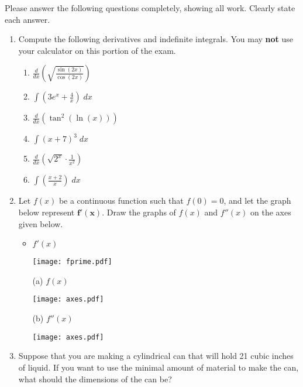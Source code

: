 \documentclass[11pt]{article}
\newcommand{\ds}{\displaystyle}
\begin{document}
\drawtitle

\noindent Please answer the following questions completely, showing all work. Clearly
state each answer.

\begin{enumerate}
\item Compute the following derivatives and indefinite integrals.  You
  may \textbf{not} use your calculator on this portion of the exam.
  \begin{enumerate}
  \item $\ds\frac{d}{dx}\left(\sqrt{\frac{\sin(2x)}{\cos(2x)}}\right)$
    \vfill
  \item $\ds\int\left(3e^x+\frac{4}{x}\right)\;dx$
    \vfill
    \newpage
  \item $\ds\frac{d}{dx}\left(\tan^2\left(\ln\left(
          x\right)\right)\right)$ \vfill
  \item $\ds\int\left(x+7\right)^3\;dx$
    \vfill
    \newpage
  \item $\ds\frac{d}{dx}\left(\sqrt{2^x}\cdot \frac{1}{x^2}\right)$
    \vfill
  \item $\ds\int\left(\frac{x+2}{x}\right)\;dx$
    \vfill
  \end{enumerate}

  \newpage
  
\item Let $f(x)$ be a continuous function such that $f(0)=0$, and let
  the graph below represent $\mathbf{f'(x)}$.  Draw the graphs of
  $f(x)$ and $f''(x)$ on the axes given below.
  \begin{itemize}
  \item $f'(x)$
    \begin{center}
      \texttt{[image: fprime.pdf]}
    \end{center}
    \vfill
  \item[(a)] $f(x)$
    \begin{center}
      \texttt{[image: axes.pdf]}
    \end{center}
    \vfill
  \item[(b)] $f''(x)$
    \begin{center}
      \texttt{[image: axes.pdf]}
    \end{center}
    \vfill
  \end{itemize}

  \newpage

\item Suppose that you are making a cylindrical can that will hold 21
  cubic inches of liquid.  If you want to use the minimal amount of
  material to make the can, what should the dimensions of the can be?
  \vfill \newpage


\end{enumerate}
\end{document}
